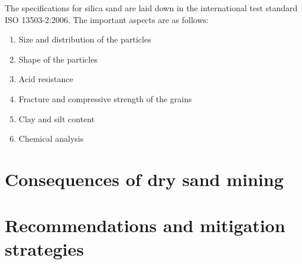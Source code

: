 The specifications for silica sand are laid down in the international test standard ISO 13503-2:2006. The important aspects are as follows:

\begin{enumerate}
    \item  Size and distribution of the particles
    \item Shape of the particles
    \item Acid resistance 
    \item Fracture and compressive strength of the grains
    \item Clay and silt content
    \item Chemical analysis
\end{enumerate}



\section{Consequences of dry sand mining}

\section{Recommendations and mitigation strategies}